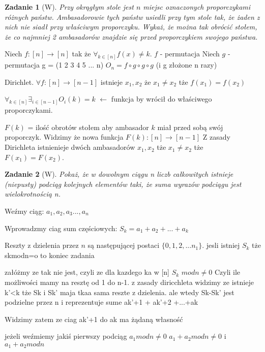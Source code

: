 \documentclass{mwbk}
\newtheorem{zad}{Zadanie}[chapter]
\begin{document}
\begin{zad}[W]
    Przy okrągłym stole jest $n$ miejsc oznaczonych proporczykami różnych
    państw. Ambasadorowie tych państw usiedli przy tym stole tak, że żaden z nich nie siadł
    przy właściwym proporczyku. Wykaż, że można tak obrócić stołem, że co najmniej 2
    ambasadorów znajdzie się przed proporczykiem swojego państwa.
\end{zad}
\begin{mdframed}
    Niech $f:[n] \to [n]$ tak że $\forall_{k\in[n]} f(x) \neq k$.
    $f$ - permutacja
    Niech $g$ - permutacja g = (1 2 3 4 5 ... n)
    $O_n = f \circ g \circ g \circ g$ (i g złożone n razy)

    Dirichlet. $\forall f:[n] \to [n-1]$ istnieje $x_1, x_2$
    że $x_1\neq x_2$ tże $f(x_1)=f(x_2)$

    $\forall_{k \in [n]} \exists_{i \in [n-1]} O_i(k) = k$
    $\leftarrow$ funkcja by wrócił do właściwego proporczykami.

    $F(k)$ = ilość obrotów stołem aby ambasador $k$ miał
    przed sobą swój proporczyk.
    Widzimy że nowa funkcja $F(k): [n] \to [n-1]$
    Z zasady Dirichleta istnienieje dwóch ambasadorów $x_1, x_2$ tże $x_1 \neq x_2$
    tże $F(x_1) = F(x_2)$.
\end{mdframed}


\begin{zad}[W]
    Pokaż, że w dowolnym ciągu n liczb całkowitych istnieje (niepusty)
    podciąg kolejnych elementów taki, że suma wyrazów podciągu jest wielokrotnością n.
\end{zad}
\begin{mdframed}
    Weźmy ciąg: $a_1, a_2, a_3 ..., a_n$

    Wprowadzmy ciag sum częściowych:
    $S_k = a_1 + a_2 + ... + a_k$

    Reszty z dzielenia przez $n$ są następującej postaci
    $\{0, 1, 2, ... n_1\}$.
    jesli istniej $S_k$ tże skmodn=o to koniec zadania

    załóżmy ze tak nie jest, czyli ze dla kazdego ka w [n]
    $S_k$ $mod n  \neq 0$
    Czyli ile możliwości mamy na resztę od 1 do n-1.
    z zasady diricchleta widzimy ze istnieje k'<k tże
    Sk i Sk' maja tkaa sama reszte z dzielenia.
    ale wtedy Sk-Sk' jest podzielne przez n i
    reprezentuje sume ak'+1 + ak'+2 +...+ak

    Widzimy zatem ze ciag ak'+1 do ak ma żądaną własność

    jeżeli weźmiemy jakiś pierwszy podciąg
    $a_1 modn \neq 0$
    $a_1 + a_2 mod n \neq 0$ i $a_1 + a_2 mod n$

\end{mdframed}
\end{document}
